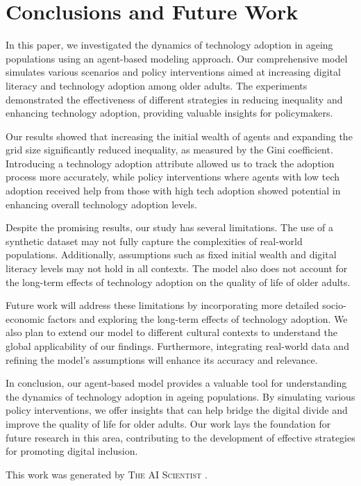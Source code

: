 \documentclass{article} %
\begin{document}
\section{Conclusions and Future Work}
\label{sec:conclusion}

In this paper, we investigated the dynamics of technology adoption in ageing populations using an agent-based modeling approach. Our comprehensive model simulates various scenarios and policy interventions aimed at increasing digital literacy and technology adoption among older adults. The experiments demonstrated the effectiveness of different strategies in reducing inequality and enhancing technology adoption, providing valuable insights for policymakers.

Our results showed that increasing the initial wealth of agents and expanding the grid size significantly reduced inequality, as measured by the Gini coefficient. Introducing a technology adoption attribute allowed us to track the adoption process more accurately, while policy interventions where agents with low tech adoption received help from those with high tech adoption showed potential in enhancing overall technology adoption levels.

Despite the promising results, our study has several limitations. The use of a synthetic dataset may not fully capture the complexities of real-world populations. Additionally, assumptions such as fixed initial wealth and digital literacy levels may not hold in all contexts. The model also does not account for the long-term effects of technology adoption on the quality of life of older adults.

Future work will address these limitations by incorporating more detailed socio-economic factors and exploring the long-term effects of technology adoption. We also plan to extend our model to different cultural contexts to understand the global applicability of our findings. Furthermore, integrating real-world data and refining the model's assumptions will enhance its accuracy and relevance.

In conclusion, our agent-based model provides a valuable tool for understanding the dynamics of technology adoption in ageing populations. By simulating various policy interventions, we offer insights that can help bridge the digital divide and improve the quality of life for older adults. Our work lays the foundation for future research in this area, contributing to the development of effective strategies for promoting digital inclusion.

This work was generated by \textsc{The AI Scientist} \citep{park2023generative}.



\end{document}
